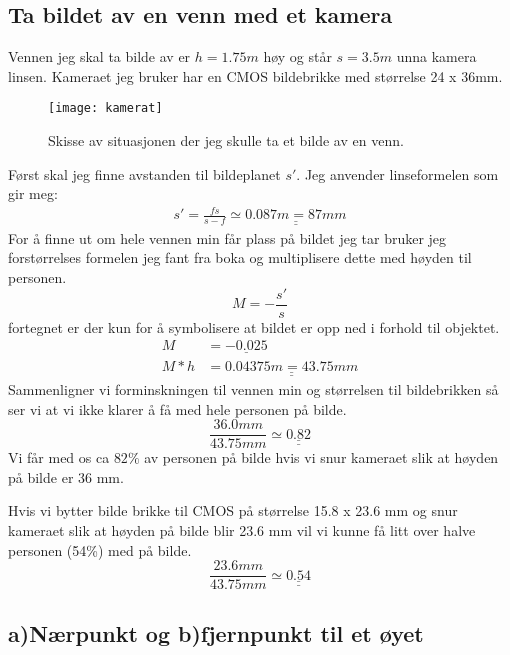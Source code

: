 \documentclass[a4paper,12pt,norsk]{article}
\newcommand{\uu}{\underline}
\begin{document}
\newpage
\subsection{Ta bildet av en venn med et kamera}
Vennen jeg skal ta bilde av er $h=1.75m$ høy og står $s=3.5m$ unna kamera linsen. Kameraet jeg bruker har en CMOS bildebrikke med størrelse 24 x 36mm. 

\begin{figure}[!h]
\centering
\texttt{[image: kamerat]}
\caption[Bilde av en venn]{Skisse av situasjonen der jeg skulle ta et bilde av en venn.}
\label{kamerat}
\end{figure}


Først skal jeg finne avstanden til bildeplanet $s'$. Jeg anvender linseformelen som gir meg:
\begin{align*}
s' = \frac{fs}{s-f} \simeq \uu{\uu{0.087m = 87mm}}
\end{align*}
For å finne ut om hele vennen min får plass på bildet jeg tar bruker jeg forstørrelses formelen jeg fant fra boka \cite[s. 329]{boka} og multiplisere dette med høyden til personen.
\begin{equation}
M = -\frac{s'}{s}
\label{M}
\end{equation}
fortegnet er der kun for å symbolisere at bildet er opp ned i forhold til objektet. 
\begin{align*}
M &= \uu{-0.025}\\
M*h &= \uu{\uu{0.04375m = 43.75mm}}
\end{align*}
Sammenligner vi forminskningen til vennen min og størrelsen til bildebrikken så ser vi at vi ikke klarer å få med hele personen på bilde. 
$$
\frac{36.0mm}{43.75mm} \simeq \uu{\uu {0.82}}
$$
Vi får med os ca $82\%$ av personen på bilde hvis vi snur kameraet slik at høyden på bilde er 36 mm.

Hvis vi bytter bilde brikke til CMOS på størrelse 15.8 x 23.6 mm og snur kameraet slik at høyden på bilde blir 23.6 mm vil vi kunne få litt over halve personen (54\%) med på bilde. 
$$
\frac{23.6mm}{43.75mm} \simeq \uu{\uu{0.54}}
$$

\subsection{a)Nærpunkt og b)fjernpunkt til et øyet}
\end{document}
